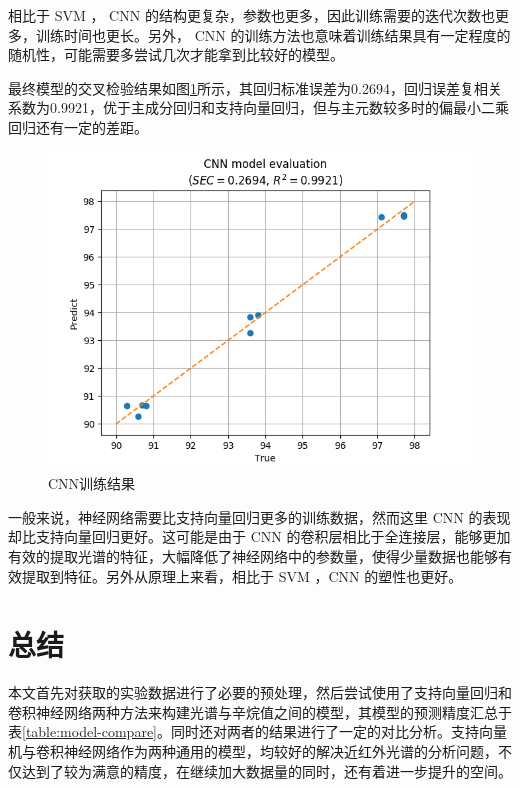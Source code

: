 \documentclass[a4paper]{article}
\begin{document}
			相比于 SVM ， CNN 的结构更复杂，参数也更多，因此训练需要的迭代次数也更多，训练时间也更长。另外， CNN 的训练方法也意味着训练结果具有一定程度的随机性，可能需要多尝试几次才能拿到比较好的模型。
			
			最终模型的交叉检验结果如图\ref{fig:cnnresult}所示，其回归标准误差为0.2694，回归误差复相关系数为0.9921，优于主成分回归和支持向量回归，但与主元数较多时的偏最小二乘回归还有一定的差距。
			
			\begin{figure}
				\centering
				\includegraphics[width=\linewidth]{../img/cnn_result}
				\caption{CNN训练结果}
				\label{fig:cnnresult}
			\end{figure}
			
			一般来说，神经网络需要比支持向量回归更多的训练数据，然而这里 CNN 的表现却比支持向量回归更好。这可能是由于 CNN 的卷积层相比于全连接层，能够更加有效的提取光谱的特征，大幅降低了神经网络中的参数量，使得少量数据也能够有效提取到特征。另外从原理上来看，相比于 SVM ，CNN 的塑性也更好。
			
	\section{总结}
		本文首先对获取的实验数据进行了必要的预处理，然后尝试使用了支持向量回归和卷积神经网络两种方法来构建光谱与辛烷值之间的模型，其模型的预测精度汇总于表\ref{table:model-compare}。同时还对两者的结果进行了一定的对比分析。支持向量机与卷积神经网络作为两种通用的模型，均较好的解决近红外光谱的分析问题，不仅达到了较为满意的精度，在继续加大数据量的同时，还有着进一步提升的空间。
		
\end{document}
